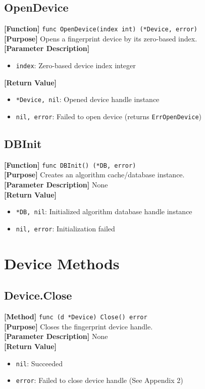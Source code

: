 \documentclass[11pt, a4paper]{article}
\begin{document}
\subsection{OpenDevice}
\textbf{[Function]} \texttt{func OpenDevice(index int) (*Device, error)} \\
\textbf{[Purpose]} Opens a fingerprint device by its zero-based index. \\
\textbf{[Parameter Description]} 
\begin{itemize}
    \item \texttt{index}: Zero-based device index integer
\end{itemize}
\textbf{[Return Value]} 
\begin{itemize}
    \item \texttt{*Device, nil}: Opened device handle instance
    \item \texttt{nil, error}: Failed to open device (returns \texttt{ErrOpenDevice})
\end{itemize}

\subsection{DBInit}
\textbf{[Function]} \texttt{func DBInit() (*DB, error)} \\
\textbf{[Purpose]} Creates an algorithm cache/database instance. \\
\textbf{[Parameter Description]} None \\
\textbf{[Return Value]} 
\begin{itemize}
    \item \texttt{*DB, nil}: Initialized algorithm database handle instance
    \item \texttt{nil, error}: Initialization failed
\end{itemize}

\section{Device Methods}

\subsection{Device.Close}
\textbf{[Method]} \texttt{func (d *Device) Close() error} \\
\textbf{[Purpose]} Closes the fingerprint device handle. \\
\textbf{[Parameter Description]} None \\
\textbf{[Return Value]} 
\begin{itemize}
    \item \texttt{nil}: Succeeded
    \item \texttt{error}: Failed to close device handle (See Appendix 2)
\end{itemize}
\end{document}
